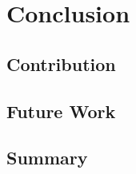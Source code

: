 \chapter{Conclusion}
\label{ch:conclusion}

\section{Contribution}

\section{Future Work}

\section{Summary}
